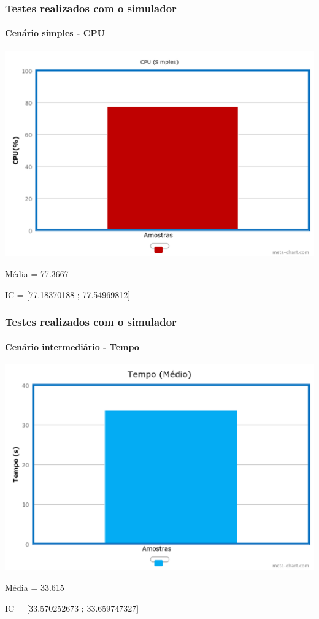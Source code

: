 \documentclass{beamer}
\begin{document}
\begin{frame}
	\frametitle{Testes realizados com o simulador}
	\framesubtitle{Cenário simples - CPU}
	\begin{center}
	\includegraphics[scale=0.18]{chart(1).png}
	\end{center}
	\begin{center}
	Média = 77.3667
	\end{center}
	\begin{center}
	IC = [77.18370188 ; 77.54969812]
	\end{center}
\end{frame}

\begin{frame}
	\frametitle{Testes realizados com o simulador}
	\framesubtitle{Cenário intermediário - Tempo}
	\begin{center}
	\includegraphics[scale=0.18]{chart(2).png}
	\end{center}
	\begin{center}
	Média = 33.615
	\end{center}
	\begin{center}
	IC = [33.570252673 ; 33.659747327]
	\end{center}
\end{frame}
\end{document}
